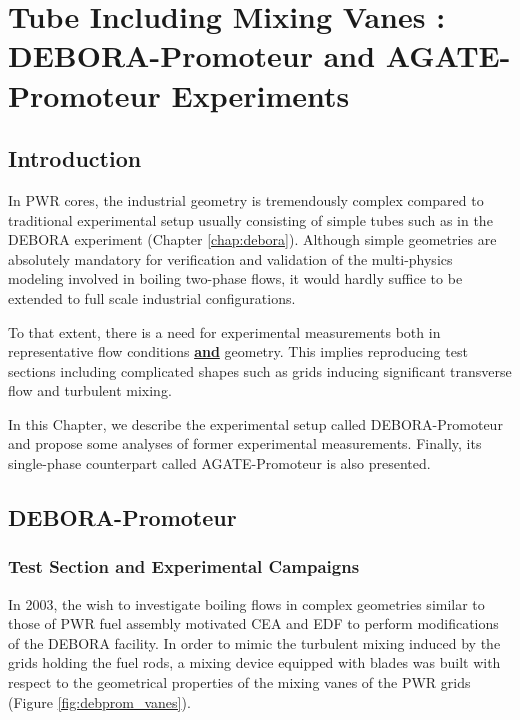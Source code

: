 
\chapter{Tube Including Mixing Vanes : DEBORA-Promoteur and AGATE-Promoteur Experiments} %

\label{ch:debora_agate_prom} %

\section{Introduction}

In PWR cores, the industrial geometry is tremendously complex compared to traditional experimental setup usually consisting of simple tubes such as in the DEBORA experiment (Chapter \ref{chap:debora}). Although simple geometries are absolutely mandatory for verification and validation of the multi-physics modeling involved in boiling two-phase flows, it would hardly suffice to be extended to full scale industrial configurations. 

\npar

To that extent, there is a need for experimental measurements both in representative flow conditions \textbf{\underline{and}} geometry. This implies reproducing test sections including complicated shapes such as grids inducing significant transverse flow and turbulent mixing. 

\npar

In this Chapter, we describe the experimental setup called DEBORA-Promoteur and propose some analyses of former experimental measurements. Finally, its single-phase counterpart called AGATE-Promoteur is also presented.



\section{DEBORA-Promoteur}

\subsection{Test Section and Experimental Campaigns}

In 2003, the wish to investigate boiling flows in complex geometries similar to those of PWR fuel assembly motivated CEA and EDF to perform modifications of the DEBORA facility. In order to mimic the turbulent mixing induced by the grids holding the fuel rods, a mixing device equipped with blades was built with respect to the geometrical properties of the mixing vanes of the PWR grids (Figure \ref{fig:debprom_vanes}).


